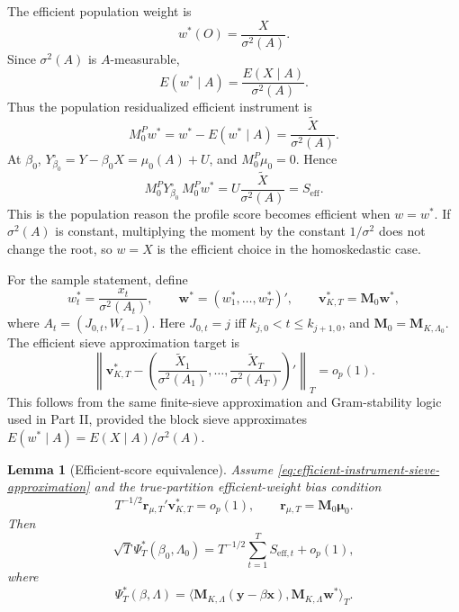\documentclass[12pt]{article}
\numberwithin{equation}{section}
\newtheorem{lemma}{Lemma}
\theoremstyle{definition}
\newcommand{\op}{o_p}
\newcommand{\innerT}[2]{\langle #1,#2\rangle_T}
\begin{document}
The efficient population weight is
\[
    w^*(O)=\frac{X}{\sigma^2(A)}.
\]
Since \(\sigma^2(A)\) is \(A\)-measurable,
\[
    E(w^*\mid A)=\frac{E(X\mid A)}{\sigma^2(A)}.
\]
Thus the population residualized efficient instrument is
\begin{equation}
    M_0^Pw^*
    =w^*-E(w^*\mid A)
    =\frac{\widetilde X}{\sigma^2(A)}.
    \label{eq:population-efficient-instrument}
\end{equation}
At \(\beta_0\), \(Y_{\beta_0}^\circ=Y-\beta_0X=\mu_0(A)+U\), and
\(M_0^P\mu_0=0\). Hence
\[
    M_0^PY_{\beta_0}^\circ\,M_0^Pw^*
    =U\frac{\widetilde X}{\sigma^2(A)}
    =S_{\mathrm{eff}}.
\]
This is the population reason the profile score becomes efficient when
\(w=w^*\). If \(\sigma^2(A)\) is constant, multiplying the moment by the
constant \(1/\sigma^2\) does not change the root, so \(w=X\) is the efficient
choice in the homoskedastic case.

For the sample statement, define
\[
    w_t^*=\frac{x_t}{\sigma^2(A_t)},
    \qquad
    \bm w^*=(w_1^*,\ldots,w_T^*)',
    \qquad
    \bm v_{K,T}^*=\bm M_0\bm w^*,
\]
where \(A_t=(J_{0,t},W_{t-1})\). Here \(J_{0,t}=j\) iff \(k_{j,0}<t\le k_{j+1,0}\), and \(\bm M_0=\bm M_{K,\Lambda_0}\). The efficient
sieve approximation target is
\begin{equation}
    \left\|\bm v_{K,T}^*
    -\left(\frac{\widetilde X_1}{\sigma^2(A_1)},\ldots,
            \frac{\widetilde X_T}{\sigma^2(A_T)}\right)'\right\|_T
    =\op(1).
    \label{eq:efficient-instrument-sieve-approximation}
\end{equation}
This follows from the same finite-sieve approximation and Gram-stability logic
used in Part II, provided the block sieve approximates
\(E(w^*\mid A)=E(X\mid A)/\sigma^2(A)\).

\begin{lemma}[Efficient-score equivalence]
\label{lem:efficient-score-equivalence}
Assume \eqref{eq:efficient-instrument-sieve-approximation} and the
true-partition efficient-weight bias condition
\[
    T^{-1/2}\bm r_{\mu,T}'\bm v_{K,T}^*=\op(1),
    \qquad
    \bm r_{\mu,T}=\bm M_0\bm\mu_0.
\]
Then
\[
    \sqrt T\Psi_T^*(\beta_0,\Lambda_0)
    =T^{-1/2}\sum_{t=1}^T S_{\mathrm{eff},t}+\op(1),
\]
where
\[
    \Psi_T^*(\beta,\Lambda)
    =\innerT{\bm M_{K,\Lambda}(\bm y-\beta\bm x)}
             {\bm M_{K,\Lambda}\bm w^*}.
\]
\end{lemma}
\end{document}
